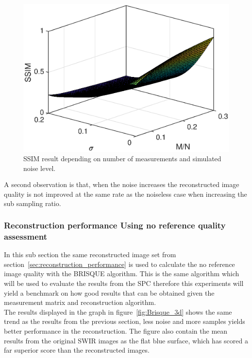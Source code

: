 \begin{figure}[H]
    \centering
    \includegraphics[width = 0.7\linewidth]{result/synt_sss/SSIM_fit.eps}
    \caption{SSIM result depending on number of measurements and simulated noise level.}
    \label{fig:ssim_3d}
\end{figure}

A second observation is that, when the noise increases the  reconstructed image quality is not improved at the same rate as the noiseless case when increasing the sub sampling ratio.

\subsubsection{Reconstruction performance Using no reference quality assessment}
In this sub section the same reconstructed image set from section~\ref{sec:reconstruction_performance} is used to calculate the no reference image quality with the BRISQUE algorithm. This is the same algorithm which will be used to evaluate the results from the SPC therefore this experiments will yield a benchmark on how good results that can be obtained given the measurement matrix and reconstruction algorithm.\\[0.1in] 

The results displayed in the graph in figure~\ref{fig:Brisque_3d} shows the same trend as the results from the previous section, less noise and more samples yields better performance in the reconstruction. The figure also contain the mean results from the original SWIR images as the flat blue surface, which has scored a far superior score than the reconstructed images.
  

